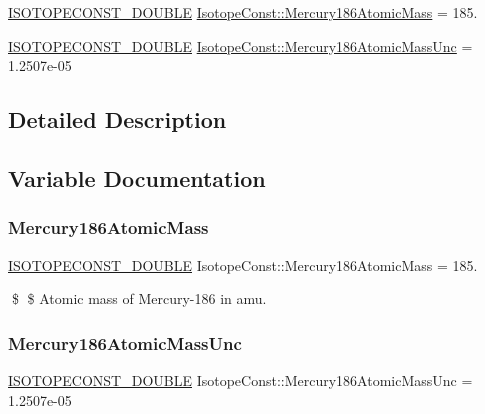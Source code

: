 \begin{DoxyCompactItemize}
\item 
\mbox{\hyperlink{group___isotope_const-_macros_ga8f45a7272ce02c0b4c65c44636ed719a}{I\+S\+O\+T\+O\+P\+E\+C\+O\+N\+S\+T\+\_\+\+D\+O\+U\+B\+LE}} \mbox{\hyperlink{group___isotope_const-_mercury-_hg186_ga936961b89fc69c3a23e49dbb8009a365}{Isotope\+Const\+::\+Mercury186\+Atomic\+Mass}} = 185.
\item 
\mbox{\hyperlink{group___isotope_const-_macros_ga8f45a7272ce02c0b4c65c44636ed719a}{I\+S\+O\+T\+O\+P\+E\+C\+O\+N\+S\+T\+\_\+\+D\+O\+U\+B\+LE}} \mbox{\hyperlink{group___isotope_const-_mercury-_hg186_ga0b832058547d2e99e7d57fc37892e7c8}{Isotope\+Const\+::\+Mercury186\+Atomic\+Mass\+Unc}} = 1.\+2507e-\/05
\end{DoxyCompactItemize}


\subsection{Detailed Description}


\subsection{Variable Documentation}
\mbox{\label{group___isotope_const-_mercury-_hg186_ga936961b89fc69c3a23e49dbb8009a365}} 
\subsubsection{\texorpdfstring{Mercury186\+Atomic\+Mass}{Mercury186AtomicMass}}
{\footnotesize\ttfamily \mbox{\hyperlink{group___isotope_const-_macros_ga8f45a7272ce02c0b4c65c44636ed719a}{I\+S\+O\+T\+O\+P\+E\+C\+O\+N\+S\+T\+\_\+\+D\+O\+U\+B\+LE}} Isotope\+Const\+::\+Mercury186\+Atomic\+Mass = 185.}

\$ \$ Atomic mass of Mercury-\/186 in amu. \mbox{\label{group___isotope_const-_mercury-_hg186_ga0b832058547d2e99e7d57fc37892e7c8}} 
\subsubsection{\texorpdfstring{Mercury186\+Atomic\+Mass\+Unc}{Mercury186AtomicMassUnc}}
{\footnotesize\ttfamily \mbox{\hyperlink{group___isotope_const-_macros_ga8f45a7272ce02c0b4c65c44636ed719a}{I\+S\+O\+T\+O\+P\+E\+C\+O\+N\+S\+T\+\_\+\+D\+O\+U\+B\+LE}} Isotope\+Const\+::\+Mercury186\+Atomic\+Mass\+Unc = 1.\+2507e-\/05}

